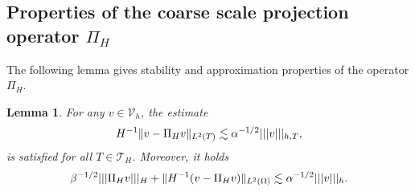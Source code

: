 \documentclass[10pt]{article}
\numberwithin{equation}{section}
\theoremstyle{plain}
\newtheorem{lemma}[theorem]{Lemma}
\theoremstyle{definition}
\theoremstyle{remark}
\begin{document}
\subsection{Properties of the coarse scale projection operator ${\Pi_H}$}\label{projection_properties}
The following lemma gives stability and approximation properties of the operator ${\Pi_H}$.
\begin{lemma}\label{lem:Lp_approx}
  For any $v\in{\mathcal{V}_h}$, the estimate
  \begin{align}\notag
    
    H^{-1}\|v-{\Pi_H} v\|_{L^2(T)}  \lesssim{\alpha}^{-1/2}{||| {v} |||_{h,{T}}},
  \end{align}
  is satisfied for all $T\in{\mathcal{T}}_H$. Moreover, it holds
  \begin{align}\notag
    {\beta}^{-1/2}{||| {{\Pi_H} v} |||_H}+\|H^{-1}(v-{\Pi_H} v)\|_{L^2(\Omega)}  \lesssim{\alpha}^{-1/2}{||| {v} |||_h}.
  \end{align}
\end{lemma}
\end{document}
